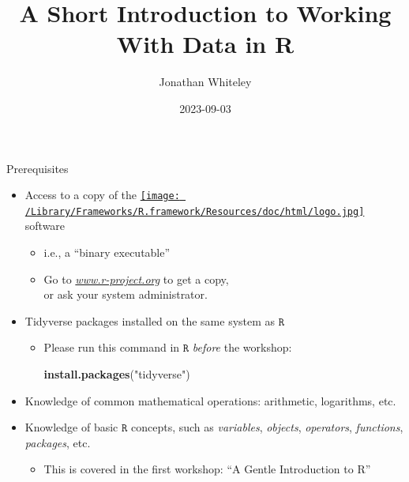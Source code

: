\documentclass[
  11pt,
  ignorenonframetext,
]{beamer}
\title{A Short Introduction to Working With Data in R}
\author{Jonathan Whiteley}
\date{2023-09-03}
\newenvironment{Shaded}{\begin{snugshade}}{\end{snugshade}}
\newcommand{\FunctionTok}[1]{\textcolor[rgb]{0.13,0.29,0.53}{\textbf{#1}}}
\newcommand{\NormalTok}[1]{#1}
\newcommand{\StringTok}[1]{\textcolor[rgb]{0.31,0.60,0.02}{#1}}
\providecommand{\tightlist}{%
  \setlength{\itemsep}{0pt}\setlength{\parskip}{0pt}}
\newcommand{\R}{\texttt{R}}
\begin{document}
\frame{\titlepage}

\begin{frame}[fragile]{Prerequisites}
\protect\hypertarget{prerequisites}{}
\begin{itemize}
\item
  Access to a copy of the
  \href{https://www.r-project.org}{\texttt{[image: /Library/Frameworks/R.framework/Resources/doc/html/logo.jpg]}}
  software

  \begin{itemize}
  \item
    i.e., a ``binary executable''
  \item
    Go to \href{https://www.r-project.org}{\emph{www.r-project.org}} to
    get a copy,\\
    or ask your system administrator.
  \end{itemize}
\item
  Tidyverse packages installed on the same system as \(\R\)

  \begin{itemize}
  \item
    Please run this command in \(\R\) \emph{before} the workshop:

\begin{Shaded}
\begin{Highlighting}[]
\FunctionTok{install.packages}\NormalTok{(}\StringTok{"tidyverse"}\NormalTok{)}
\end{Highlighting}
\end{Shaded}
  \end{itemize}
\item
  Knowledge of common mathematical operations: arithmetic, logarithms,
  etc.
\item
  Knowledge of basic \(\R\) concepts, such as \emph{variables},
  \emph{objects}, \emph{operators}, \emph{functions}, \emph{packages},
  etc.

  \begin{itemize}
  \tightlist
  \item
    This is covered in the first workshop: ``A Gentle Introduction to
    R''
  \end{itemize}
\end{itemize}
\end{frame}
\end{document}
